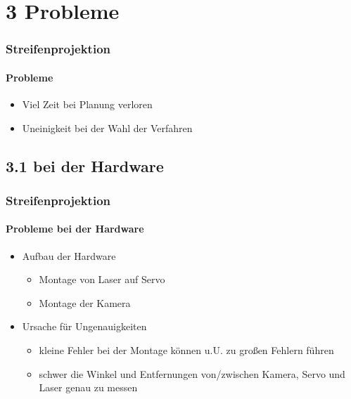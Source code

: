 \documentclass{beamer}
\begin{document}
\section{3 \hspace{5px} Probleme}
\begin{frame}
	\frametitle{Streifenprojektion}
	\framesubtitle{Probleme}

	\begin{itemize}
		\item Viel Zeit bei Planung verloren
		\item Uneinigkeit bei der Wahl der Verfahren
	\end{itemize}

\end{frame}

\subsection{3.1 \hspace{5px} bei der Hardware}
\begin{frame}
	\frametitle{Streifenprojektion}
	\framesubtitle{Probleme bei der Hardware}

	\begin{itemize}
		\item Aufbau der Hardware
		\begin{itemize}
			\item Montage von Laser auf Servo
			\item Montage der Kamera
		\end{itemize}
		\item Ursache für Ungenauigkeiten
		\begin{itemize}
			\item kleine Fehler bei der Montage können u.U. zu großen Fehlern führen
			\item schwer die Winkel und Entfernungen von/zwischen Kamera, Servo und Laser genau zu messen 
		\end{itemize}
	\end{itemize}

\end{frame}
\end{document}
